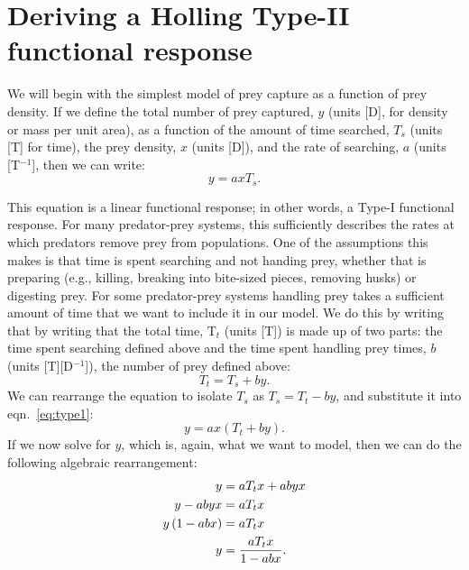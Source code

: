 \documentclass[11pt]{article}
\begin{document}
\section{Deriving a Holling Type-II functional response}

We will begin with the simplest model of prey capture as a function of prey density. If we define the total number of prey captured, $y$ (units [D], for density or mass per unit area), as a function of the amount of time searched, $T_s$ (units [T] for time), the prey density, $x$ (units [D]), and the rate of searching, $a$ (units [T$^{-1}$], then we can write:
    \begin{equation}
    y = axT_s. \label{eq:type1}
    \end{equation}

This equation is a linear functional response; in other words, a Type-I functional response. For many predator-prey systems, this sufficiently describes the rates at which predators remove prey from populations. One of the assumptions this makes is that time is  spent searching and not handing prey, whether that is preparing (e.g., killing, breaking into bite-sized pieces, removing husks) or digesting prey. For some predator-prey systems handling prey takes a sufficient amount of time that we want to include it in our model. We do this by writing that by writing that the total time, T$_t$ (units [T]) is made up of two parts: the time spent searching defined above and the time spent handling prey times, $b$ (units [T][D$^{-1}$]), the number of prey defined above:
    \begin{equation}
    T_t = T_s + by.
    \end{equation}
We can rearrange the equation to isolate $T_s$ as $ T_s =  T_t - by$, and substitute it into eqn.~\ref{eq:type1}:
    \begin{equation}
    y = ax\left(T_t + by\right).
    \end{equation}
If we now solve for $y$, which is, again, what we want to model, then we can do the following algebraic rearrangement:
\begin{equation}
\begin{subequations}
\begin{aligned}
    y &= aT_tx + abyx \\
    y - abyx &= aT_tx \\
    y\left(1 - abx\right) &= aT_tx \\
     y &= \frac{aT_tx}{1 - abx}. \label{eq:type2}
\end{aligned}
\end{subequations}
\end{equation}
\end{document}
